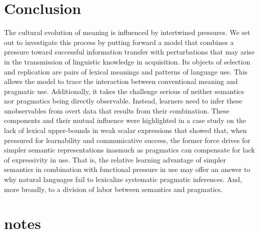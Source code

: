 \documentclass[a4paper, 11pt]{article}
\theoremstyle{Satz}
\begin{document}
\section{Conclusion}
The cultural evolution of meaning is influenced by intertwined pressures. We set out to
investigate this process by putting forward a model that combines a pressure toward successful
information transfer with perturbations that may arise in the transmission of linguistic
knowledge in acquisition. Its objects of selection and replication are pairs of lexical
meanings and patterns of language use. This allows the model to trace the interaction between
conventional meaning and pragmatic use. Additionally, it takes the challenge serious of neither
semantics nor pragmatics being directly observable. Instead, learners need to infer these
unobservables from overt data that results from their combination.  These components and their
mutual influence were highlighted in a case study on the lack of lexical upper-bounds in weak
scalar expressions that showed that, when pressured for learnability and communicative success, the
former force drives for simpler semantic representations inasmuch as pragmatics can compensate
for lack of expressivity in use. That is, the relative learning advantage of simpler semantics
in combination with functional pressure in use may offer an answer to why natural languages
fail to lexicalize systematic pragmatic inferences. And, more broadly, to a division of labor
between semantics and pragmatics.




\newpage

\appendix


\section{notes}
\end{document}
